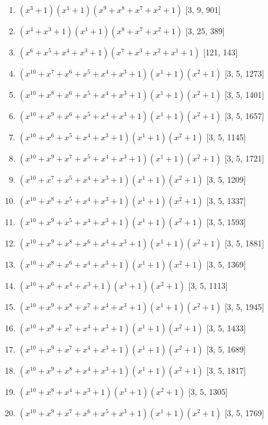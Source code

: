 \documentclass[10pt,twocolumn]{article}
\begin{document}
\begin{enumerate}
\item $(x^{3} + 1)(x^{1} + 1)(x^{9} + x^{8} + x^{7} + x^{2} + 1)$  [3, 9, 901]
\item $(x^{4} + x^{3} + 1)(x^{1} + 1)(x^{8} + x^{7} + x^{2} + 1)$  [3, 25, 389]
\item $(x^{6} + x^{5} + x^{4} + x^{3} + 1)(x^{7} + x^{3} + x^{2} + x^{1} + 1)$  [121, 143]
\item $(x^{10} + x^{7} + x^{6} + x^{5} + x^{4} + x^{3} + 1)(x^{1} + 1)(x^{2} + 1)$  [3, 5, 1273]
\item $(x^{10} + x^{8} + x^{6} + x^{5} + x^{4} + x^{3} + 1)(x^{1} + 1)(x^{2} + 1)$  [3, 5, 1401]
\item $(x^{10} + x^{9} + x^{6} + x^{5} + x^{4} + x^{3} + 1)(x^{1} + 1)(x^{2} + 1)$  [3, 5, 1657]
\item $(x^{10} + x^{6} + x^{5} + x^{4} + x^{3} + 1)(x^{1} + 1)(x^{2} + 1)$  [3, 5, 1145]
\item $(x^{10} + x^{9} + x^{7} + x^{5} + x^{4} + x^{3} + 1)(x^{1} + 1)(x^{2} + 1)$  [3, 5, 1721]
\item $(x^{10} + x^{7} + x^{5} + x^{4} + x^{3} + 1)(x^{1} + 1)(x^{2} + 1)$  [3, 5, 1209]
\item $(x^{10} + x^{8} + x^{5} + x^{4} + x^{3} + 1)(x^{1} + 1)(x^{2} + 1)$  [3, 5, 1337]
\item $(x^{10} + x^{9} + x^{5} + x^{4} + x^{3} + 1)(x^{1} + 1)(x^{2} + 1)$  [3, 5, 1593]
\item $(x^{10} + x^{9} + x^{8} + x^{6} + x^{4} + x^{3} + 1)(x^{1} + 1)(x^{2} + 1)$  [3, 5, 1881]
\item $(x^{10} + x^{8} + x^{6} + x^{4} + x^{3} + 1)(x^{1} + 1)(x^{2} + 1)$  [3, 5, 1369]
\item $(x^{10} + x^{6} + x^{4} + x^{3} + 1)(x^{1} + 1)(x^{2} + 1)$  [3, 5, 1113]
\item $(x^{10} + x^{9} + x^{8} + x^{7} + x^{4} + x^{3} + 1)(x^{1} + 1)(x^{2} + 1)$  [3, 5, 1945]
\item $(x^{10} + x^{8} + x^{7} + x^{4} + x^{3} + 1)(x^{1} + 1)(x^{2} + 1)$  [3, 5, 1433]
\item $(x^{10} + x^{9} + x^{7} + x^{4} + x^{3} + 1)(x^{1} + 1)(x^{2} + 1)$  [3, 5, 1689]
\item $(x^{10} + x^{9} + x^{8} + x^{4} + x^{3} + 1)(x^{1} + 1)(x^{2} + 1)$  [3, 5, 1817]
\item $(x^{10} + x^{8} + x^{4} + x^{3} + 1)(x^{1} + 1)(x^{2} + 1)$  [3, 5, 1305]
\item $(x^{10} + x^{9} + x^{7} + x^{6} + x^{5} + x^{3} + 1)(x^{1} + 1)(x^{2} + 1)$  [3, 5, 1769]

\end{enumerate}
\end{document}
